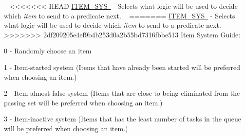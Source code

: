 ~\newline
<<<<<<< HEAD
\mbox{\hyperlink{namespacedynamicfilterapp_1_1toggles_ae8b7db6fd373a0c3225ad361f894aee2}{I\+T\+E\+M\+\_\+\+S\+YS }} -\/ Selects what logic will be used to decide which {\itshape item} to send to a predicate next. ~\newline
=======
\mbox{\hyperlink{}{I\+T\+E\+M\+\_\+\+S\+YS }} -\/ Selects what logic will be used to decide which {\itshape item} to send to a predicate next. ~\newline
>>>>>>> 2df209205e4ef9b4b253d0a2b55bd7316fbbe513
Item System Guide\+:
\begin{DoxyItemize}
\item 0 -\/ Randomly choose an item
\item 1 -\/ Item-\/started system (Items that have already been started will be preferred when choosing an item.)
\item 2 -\/ Item-\/almost-\/false system (Items that are close to being eliminated from the passing set will be preferred when choosing an item.)
\item 3 -\/ Item-\/inactive system (Items that has the least number of tasks in the queue will be preferred when choosing an item.)
\end{DoxyItemize}

